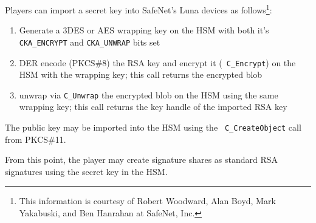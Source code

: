 Players can import a secret key into SafeNet's Luna devices as follows\footnote{This information is courtesy of Robert
Woodward, Alan Boyd, Mark Yakabuski, and Ben Hanrahan at SafeNet,
Inc.}:
\begin{enumerate}
\item Generate a 3DES or AES wrapping key on the HSM with both it's
{\tt CKA\_ENCRYPT} and {\tt CKA\_UNWRAP} bits set

\item DER encode (PKCS\#8) the RSA key and encrypt it ({\tt
C\_Encrypt}) on the HSM with the wrapping key; this call returns the
encrypted blob

\item unwrap via {\tt C\_Unwrap} the encrypted blob on the HSM using the same
wrapping key; this call returns the key handle of the imported RSA key
\end{enumerate}
The public key may be imported into the HSM using the {\tt
C\_CreateObject} call from PKCS\#11.

From this point, the player may create signature shares as standard
RSA signatures using the secret key in the HSM.